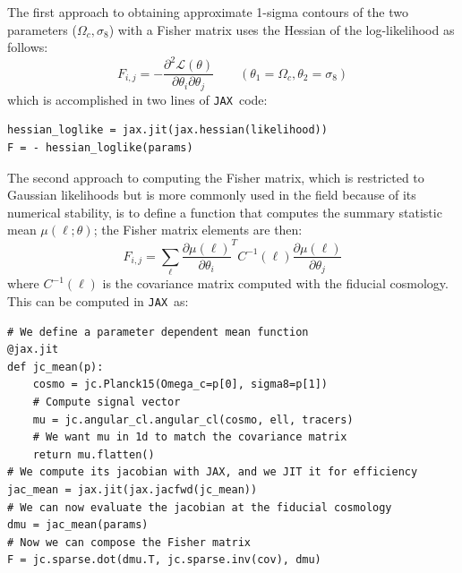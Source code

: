 \documentclass[twocolumn,twocolappendix,nofootinbib,iop]{openjournal}
\newcommand{\jax}{\texttt{JAX}}
\begin{document}
The first approach to obtaining approximate 1-sigma contours of the two parameters ($\Omega_c, \sigma_8$) with a Fisher matrix uses the Hessian of the log-likelihood as follows:
\begin{equation}
F_{i,j} = - \frac{\partial^2\mathcal{L}(\theta)}{\partial \theta_i \partial \theta_j}
\qquad (\theta_1=\Omega_c, \theta_2=\sigma_8)
\label{eq:fisher_way1}
\end{equation}
which is accomplished in two lines of \jax\ code:
\begin{lstlisting}[language=iPython]
hessian_loglike = jax.jit(jax.hessian(likelihood))
F = - hessian_loglike(params)
\end{lstlisting}

The second approach to computing the Fisher matrix, which is restricted to Gaussian likelihoods but is more commonly used in the field because of its numerical stability, is to define a function that computes the summary statistic mean  $\mu(\ell; \theta)$; the Fisher matrix elements are then:
\begin{equation}
    F_{i,j} = \sum_\ell \frac{\partial \mu(\ell)}{\partial \theta_i}^T C^{-1}(\ell)\frac{\partial \mu(\ell)}{\partial \theta_j}
    \label{eq:fisher_way2}
\end{equation}
where $C^{-1}(\ell)$ is the covariance matrix computed with the fiducial cosmology. This can be computed in \jax\ as: 
\begin{lstlisting}[language=iPython]
# We define a parameter dependent mean function
@jax.jit
def jc_mean(p):
    cosmo = jc.Planck15(Omega_c=p[0], sigma8=p[1])
    # Compute signal vector
    mu = jc.angular_cl.angular_cl(cosmo, ell, tracers)
    # We want mu in 1d to match the covariance matrix
    return mu.flatten() 
# We compute its jacobian with JAX, and we JIT it for efficiency
jac_mean = jax.jit(jax.jacfwd(jc_mean))
# We can now evaluate the jacobian at the fiducial cosmology
dmu = jac_mean(params)
# Now we can compose the Fisher matrix
F = jc.sparse.dot(dmu.T, jc.sparse.inv(cov), dmu)
\end{lstlisting}
\end{document}
